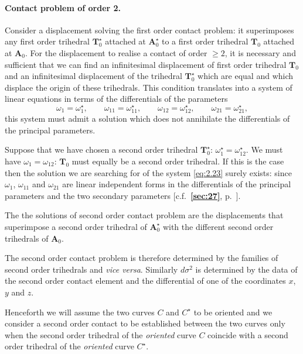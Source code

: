 \documentclass[leqno,11pt]{book}
\numberwithin{equation}{chapter}
\theoremstyle{shape1}
\theoremstyle{shapesmall}
\newcommand{\fsref}[1]{{\rm\textsection\textbf{\ref{sec:#1}}}}
\newcommand{\str}{^{\star}}
\begin{document}
\paragraph{Contact problem of order 2.}
\label{sec:33}
Consider a displacement solving the first order contact problem: it superimposes any first order trihedral $\mathbf{T}\str_{0}$ attached at $\mathbf{A}\str_{0}$ to a first order trihedral $\mathbf{T}_{0}$ attached at $\mathbf{A}_{0}$. For the displacement to realise a contact of order $\ge 2$, it is necessary and sufficient that we can find an infinitesimal displacement of first order trihedral $\mathbf{T}_{0}$ and an infinitesimal displacement of the trihedral $\mathbf{T}\str_{0}$ which are equal and which displace the origin of these trihedrals. This condition translates into a system of linear equations in terms of the differentials of the parameters
\begin{equation}
  \label{eq:2.23}
  \omega_{1}=\omega_{1}\str,\qquad\omega_{11}=\omega_{11}\str,\qquad\omega_{12}=\omega_{12}\str,\qquad\omega_{21}=\omega_{21}\str,
\end{equation}
this system must admit a solution which does not annihilate the differentials of the principal parameters.

Suppose that we have chosen a second order trihedral $\mathbf{T}_{0}\str$: $\omega_{1}\str=\omega_{12}\str$. We must have $\omega_{1}=\omega_{12}$: $\mathbf{T}_{0}$ must equally be a second order trihedral. If this is the case then the solution we are searching for of the system \eqref{eq:2.23} surely exists: since $\omega_{1}$, $\omega_{11}$ and $\omega_{21}$ are linear independent forms in the differentials of the principal parameters and the two secondary parameters [c.f.~\fsref{27}, p.~\pageref{sec:31}].

The the solutions of second order contact problem are the displacements that superimpose a second order trihedral of $\mathbf{A}\str_{0}$ with the different second order trihedrals of $\mathbf{A}_{0}$.

The second order contact problem is therefore determined by the families of second order trihedrals and \emph{vice versa}. Similarly $d\sigma^{2}$ is determined by the data of the second order contact element and the differential of one of the coordinates $x$, $y$ and $z$.

Henceforth we will assume the two curves $C$ and $C\str$ to be oriented and we consider a second order contact to be established between the two curves only when the second order trihedral of the \emph{oriented} curve $C$ coincide with a second order trihedral of the \emph{oriented} curve $C\str$.
\end{document}

